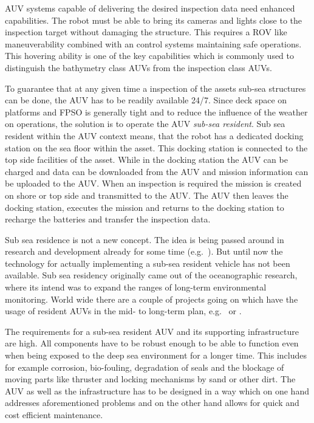 \documentclass[conference]{IEEEtran}
\begin{document}
AUV systems capable of delivering the desired inspection data need enhanced capabilities.
The robot must be able to bring its cameras and lights close to the inspection target
without damaging the structure. This requires a ROV like maneuverability combined with an
control systems maintaining safe operations. This hovering ability is one of the key
capabilities which is commonly used to distinguish the bathymetry class AUVs from the
inspection class AUVs.

To guarantee that at any given time a inspection of the assets sub-sea structures can be
done, the AUV has to be readily available 24/7. Since deck space on platforms and FPSO is
generally tight and to reduce the influence of the weather on operations, the solution is
to operate the AUV \textit{sub-sea resident}. Sub sea resident within the AUV context
means, that the robot has a dedicated docking station on the sea floor within the asset.
This docking station is connected to the top side facilities of the asset. While in the
docking station the AUV can be charged and data can be downloaded from the AUV and 
mission
information can be uploaded to the AUV. When an inspection is required the mission is
created on shore or top side and transmitted to the AUV. The AUV then leaves the docking
station, executes the mission and returns to the docking station to recharge the batteries
and transfer the inspection data.

Sub sea residence is not a new concept. The idea is being passed around in research and
development already for some time (e.g.~\cite{mcleod2011}). But until now the technology
for actually implementing a sub-sea resident vehicle has not been available. Sub sea
residency originally came out of the oceanographic research, where its intend was to
expand the ranges of long-term environmental monitoring. World wide there are a couple of
projects going on which have the usage of resident AUVs in the mid- to long-term plan,
e.g.~\cite{german2012} or \cite{soltwedel2013}.

The requirements for a sub-sea resident AUV and its supporting infrastructure are high.
All components have to be robust enough to be able to function even when being exposed 
to
the deep sea environment for a longer time. This includes for example corrosion,
bio-fouling, degradation of seals and the blockage of moving parts like thruster and
locking mechanisms by sand or other dirt. The AUV as well as the infrastructure has to be
designed in a way which on one hand addresses aforementioned problems and on the other
hand allows for quick and cost efficient maintenance.
\end{document}
